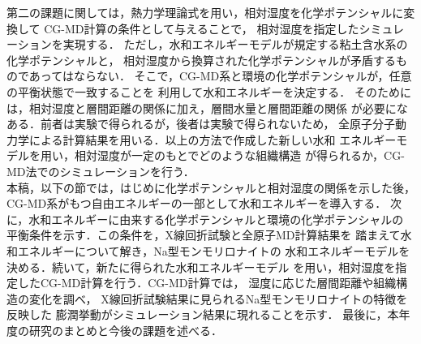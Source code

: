 第二の課題に関しては，熱力学理論式を用い，相対湿度を化学ポテンシャルに変換して
CG-MD計算の条件として与えることで，
相対湿度を指定したシミュレーションを実現する．
ただし，水和エネルギーモデルが規定する粘土含水系の化学ポテンシャルと，
相対湿度から換算された化学ポテンシャルが矛盾するものであってはならない．
そこで，CG-MD系と環境の化学ポテンシャルが，任意の平衡状態で一致することを
利用して水和エネルギーを決定する．
そのためには，相対湿度と層間距離の関係に加え，層間水量と層間距離の関係
が必要になある．前者は実験で得られるが，後者は実験で得られないため，
全原子分子動力学による計算結果を用いる．以上の方法で作成した新しい水和
エネルギーモデルを用い，相対湿度が一定のもとでどのような組織構造
が得られるか，CG-MD法でのシミュレーションを行う．\\
\hspace{\parindent}
本稿，以下の節では，はじめに化学ポテンシャルと相対湿度の関係を示した後，
CG-MD系がもつ自由エネルギーの一部として水和エネルギーを導入する．
次に，水和エネルギーに由来する化学ポテンシャルと環境の化学ポテンシャルの
平衡条件を示す．この条件を，X線回折試験と全原子MD計算結果を
踏まえて水和エネルギーについて解き，Na型モンモリロナイトの
水和エネルギーモデルを決める．続いて，新たに得られた水和エネルギーモデル
を用い，相対湿度を指定したCG-MD計算を行う．CG-MD計算では，
湿度に応じた層間距離や組織構造の変化を調べ，
X線回折試験結果に見られるNa型モンモリロナイトの特徴を反映した
膨潤挙動がシミュレーション結果に現れることを示す．
最後に，本年度の研究のまとめと今後の課題を述べる．
